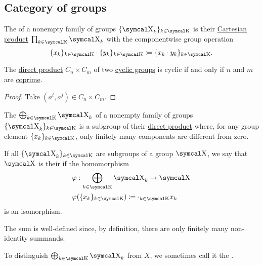 \subsection{Category of groups}\label{subsec:groups}

\begin{definition}\label{def:group_direct_product}
  The  of a nonempty family of groups \( \{ \CX_k \}_{k \in \CK} \) is their \hyperref[def:cartesian_product]{Cartesian product} \( \prod_{k \in \CK} \CX_k \) with the componentwise group operation
  \begin{equation*}
    \{ x_k \}_{k \in \CK} \cdot \{ y_k \}_{k \in \CK}
    \coloneqq
    \{ x_k \cdot y_k \}_{k \in \CK}.
  \end{equation*}
\end{definition}

\begin{proposition}\label{thm:product_of_cyclic_groups}
  The \hyperref[def:group_direct_product]{direct product} \( C_n \times C_m \) of two \hyperref[def:cyclic_group]{cyclic groups} is cyclic if and only if \( n \) and \( m \) are \hyperref[def:coprime_numbers]{coprime}.
\end{proposition}
\begin{proof}
  Take \( (a^i, a^j) \in C_n \times C_m \).
\end{proof}

\begin{definition}\label{def:group_direct_sum}
  The  \( \bigoplus_{k \in \CK} \CX_k \) of a nonempty family of groups \( \{ \CX_k \}_{k \in \CK} \) is a subgroup of their \hyperref[def:group_direct_sum]{direct product} where, for any group element \( \{ x_k \}_{k \in \CK} \), only finitely many components are different from zero.

  \begin{DefEnum}
    If all \( \{ \CX_k \}_{k \in \CK} \) are subgroups of a group \( \CX \), we say that \( \CX \) is their  if the homomorphism
    \begin{align*}
       &\varphi: \bigoplus_{k \in \CK} \CX_k \to \CX \\
       &\varphi(\{ x_k \}_{k \in \CK}) \coloneqq \cdot_{k \in \CK} x_k
    \end{align*}
    is an isomorphism.

    The sum is well-defined since, by definition, there are only finitely many non-identity summands.

     To distinguish \( \bigoplus_{k \in \CK} \CX_k \) from \( X \), we sometimes call it the .
  \end{DefEnum}
\end{definition}

